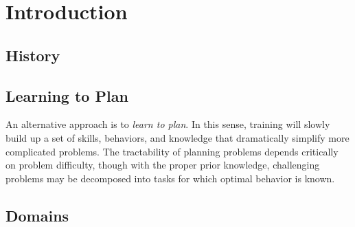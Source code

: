 \documentclass[11pt]{article}
\begin{document}
\newpage
\tableofcontents
\newpage

\section{Introduction}
\label{sec:introduction}



\subsection{History}

\subsection{Learning to Plan}
An alternative approach is to {\it learn to plan}. In this sense, training  will slowly build up a set of skills, behaviors, and knowledge that dramatically simplify more complicated problems.
The tractability of planning problems depends critically on problem difficulty, though with the proper prior knowledge, challenging problems may be decomposed into tasks for which optimal behavior is known.

\subsection{Domains}
\end{document}
